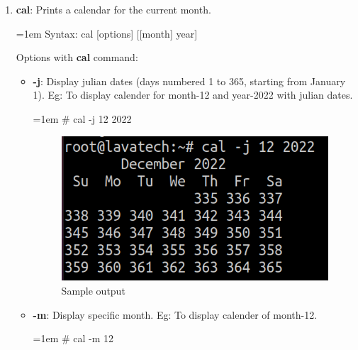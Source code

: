 \begin{flushleft}
\begin{enumerate}
\begin{enumerate}[label=(\alph*)]
		\end{enumerate}
		\bigskip
		\bigskip
		\item \textbf{cal}: Prints a calendar for the current month.
			\bigskip
			\begin{tcolorbox}[breakable,notitle,boxrule=-0pt,colback=pink,colframe=pink]
				\color{black}
				\font=1em
				Syntax: cal [options] [[month] year]
				\font=4pt
			\end{tcolorbox}
			Options with \textbf{cal} command:
			\begin{itemize}
				\item \textbf{-j}: Display julian dates (days numbered 1 to 365, starting from January 1).
				\newline
				Eg: To display calender for month-12 and year-2022 with julian dates.
				\begin{tcolorbox}[breakable,notitle,boxrule=-0pt,colback=black,colframe=black]
					\color{green}
					\font=1em
					\# cal -j 12 2022
					\font=4pt
				\end{tcolorbox}
				
				\begin{figure}[h!]
					\centering
					\includegraphics[scale=0.4]{content/chapter2/images/cal1.png}
					\caption{Sample output}
					\label{fig:cal1}
				\end{figure}

				\item \textbf{-m}: Display specific month.
				\newline
				Eg: To display calender of month-12.
				\begin{tcolorbox}[breakable,notitle,boxrule=-0pt,colback=black,colframe=black]
					\color{green}
					\fontdimen2\font=1em
					\# cal -m 12
					\fontdimen2\font=4pt
				\end{tcolorbox}
				

\end{itemize}
\end{enumerate}
\end{flushleft}

